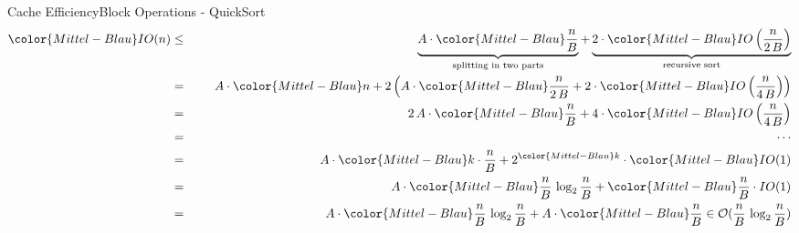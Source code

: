 
\begin{frame}{Cache Efficiency}{Block Operations - QuickSort}
  \begin{eqnarray*}
    {\color{Mittel-Blau}IO(n)} &\leq\hspace{1.5em}&
      \underbrace{
        A \cdot {\color{Mittel-Blau}\frac{n}{B}}
      }_{\text{splitting in two parts}}
      +
      \underbrace{
        2 \cdot {\color{Mittel-Blau}IO\left(\frac{n}{2\,B}\right)}
      }_{\text{recursive sort}}\\
    {} &=&
      A \cdot {\color{Mittel-Blau}n} + 2 \left(
        A \cdot {\color{Mittel-Blau}\frac{n}{2\,B}}
        + 2 \cdot {\color{Mittel-Blau}IO\left(\frac{n}{4\,B}\right)}
      \right)\\
    {} &=&
      2\,A \cdot {\color{Mittel-Blau}\frac{n}{B}}
      + 4 \cdot {\color{Mittel-Blau}IO\left(\frac{n}{4\,B}\right)}\\
    {} &=&\hspace{1.5em}\cdots\\
    {} &=&
      A \cdot {\color{Mittel-Blau}k \cdot \frac{n}{B}}
      + 2^{\color{Mittel-Blau}k}
      \cdot {\color{Mittel-Blau}IO(1)}\\
    {} &=&
      A \cdot {\color{Mittel-Blau}\frac{n}{B} \, \log_2 \frac{n}{B}}
      + {\color{Mittel-Blau}\frac{n}{B} \cdot IO(1)}\\
    {} &=&
      A \cdot {\color{Mittel-Blau}\frac{n}{B} \, \log_2 \frac{n}{B}}
      + A \cdot {\color{Mittel-Blau}\frac{n}{B}}
      \in \mathcal{O}(\frac{n}{B} \, \log_2 \frac{n}{B})
  \end{eqnarray*}
\end{frame}